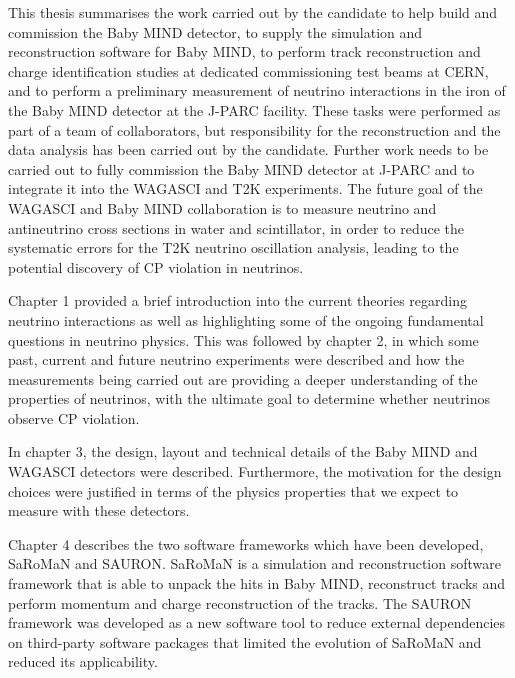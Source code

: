 This thesis summarises the work carried out by the candidate to help build and commission the Baby MIND detector, to supply the simulation and reconstruction software for Baby MIND, to perform track reconstruction and charge identification studies at dedicated commissioning test beams at CERN, and to perform a preliminary measurement of neutrino interactions in the iron of the Baby MIND detector at the J-PARC facility. These tasks were performed as part of a team of collaborators, but responsibility for the reconstruction and the data analysis has been carried out by the candidate. Further work needs to be carried out to fully commission the Baby MIND detector at J-PARC and to integrate it into the WAGASCI and T2K experiments. The future goal of the WAGASCI and Baby MIND collaboration is to measure neutrino and antineutrino cross sections in water and scintillator, in order to reduce the systematic errors for the T2K neutrino oscillation analysis, leading to the potential discovery of CP violation in neutrinos. 

Chapter 1 provided a brief introduction into the current theories regarding neutrino interactions as well as highlighting some of the ongoing fundamental questions in neutrino physics. This was followed by chapter 2, in which some past, current and future neutrino experiments were described and how the measurements being carried out are providing a deeper understanding of the properties of neutrinos, with the ultimate goal to determine whether neutrinos observe CP violation.



In chapter 3, the design, layout and technical details of the Baby MIND and WAGASCI detectors were described. Furthermore, the motivation for the design choices were justified in terms of the physics properties that we expect to measure with these detectors. 

Chapter 4 describes the two software frameworks which have been developed, SaRoMaN  and SAURON. SaRoMaN is a simulation and reconstruction software framework that is able to unpack the hits in Baby MIND, reconstruct tracks and perform momentum and charge reconstruction of the tracks. The SAURON framework was developed as a new software tool to reduce external dependencies on third-party software packages that limited the evolution of SaRoMaN and reduced its applicability.

